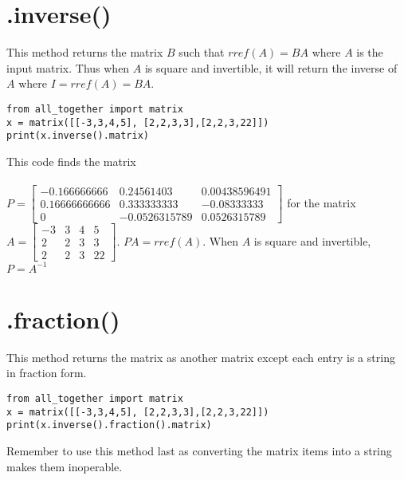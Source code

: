 \documentclass{article}
\begin{document}
\section{.inverse()}
This method returns the matrix \(B\) such that \(rref(A) = BA\) where \(A\) is the input matrix.
Thus when \(A\) is square and invertible, it will return the inverse of \(A\) where \(I = rref(A) = BA\). 
\begin{lstlisting}
from all_together import matrix
x = matrix([[-3,3,4,5], [2,2,3,3],[2,2,3,22]])
print(x.inverse().matrix) 
\end{lstlisting}
This code finds the matrix \\ \\ \(P = \left[ \begin{array}{cccc} -0.166666666&0.24561403&0.00438596491 \\ 0.16666666666&0.333333333&-0.08333333 \\ 0&-0.0526315789&0.0526315789 \end{array}\right]\) for the matrix \(A = \left[ \begin{array}{cccc} -3&3&4&5 \\ 2&2&3&3 \\ 2&2&3&22 \end{array}\right]\). \(PA = rref(A)\). When \(A\) is square and invertible,  \(P = A^{-1}\)

\section{.fraction()}
This method returns the matrix as another matrix except each entry is a string in fraction form. 
\begin{lstlisting}
from all_together import matrix
x = matrix([[-3,3,4,5], [2,2,3,3],[2,2,3,22]])
print(x.inverse().fraction().matrix) 
\end{lstlisting}
Remember to use this method last as converting the matrix items into a string makes them inoperable.
\end{document}
